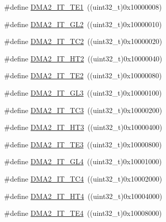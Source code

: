 \begin{DoxyCompactItemize}
\item 
\#define \mbox{\hyperlink{group___d_m_a__interrupts__definition_ga912b0a1e7104dc70d25ca1a33338b6eb}{D\+M\+A2\+\_\+\+I\+T\+\_\+\+T\+E1}}~((uint32\+\_\+t)0x10000008)
\item 
\#define \mbox{\hyperlink{group___d_m_a__interrupts__definition_gad1b225f7053b88eeee62e5ed1801b5c3}{D\+M\+A2\+\_\+\+I\+T\+\_\+\+G\+L2}}~((uint32\+\_\+t)0x10000010)
\item 
\#define \mbox{\hyperlink{group___d_m_a__interrupts__definition_ga174df6fdfa25046c1481ede66ff1eb6d}{D\+M\+A2\+\_\+\+I\+T\+\_\+\+T\+C2}}~((uint32\+\_\+t)0x10000020)
\item 
\#define \mbox{\hyperlink{group___d_m_a__interrupts__definition_gaf1cb017935477795a7bfb0d1a271e69a}{D\+M\+A2\+\_\+\+I\+T\+\_\+\+H\+T2}}~((uint32\+\_\+t)0x10000040)
\item 
\#define \mbox{\hyperlink{group___d_m_a__interrupts__definition_ga5f32004b492a225495c9c1dcd5002042}{D\+M\+A2\+\_\+\+I\+T\+\_\+\+T\+E2}}~((uint32\+\_\+t)0x10000080)
\item 
\#define \mbox{\hyperlink{group___d_m_a__interrupts__definition_ga9876a20bc7ae5ccff6d4e62a8b767070}{D\+M\+A2\+\_\+\+I\+T\+\_\+\+G\+L3}}~((uint32\+\_\+t)0x10000100)
\item 
\#define \mbox{\hyperlink{group___d_m_a__interrupts__definition_ga249abc1068e8979f52d7d867b5de5a75}{D\+M\+A2\+\_\+\+I\+T\+\_\+\+T\+C3}}~((uint32\+\_\+t)0x10000200)
\item 
\#define \mbox{\hyperlink{group___d_m_a__interrupts__definition_gab3c0d024e03f9fdca539710c7e528904}{D\+M\+A2\+\_\+\+I\+T\+\_\+\+H\+T3}}~((uint32\+\_\+t)0x10000400)
\item 
\#define \mbox{\hyperlink{group___d_m_a__interrupts__definition_ga2fd4ce5d7e2d67c05379f826ae1b1da6}{D\+M\+A2\+\_\+\+I\+T\+\_\+\+T\+E3}}~((uint32\+\_\+t)0x10000800)
\item 
\#define \mbox{\hyperlink{group___d_m_a__interrupts__definition_ga004761fbcd7dba2f242639b2992ada17}{D\+M\+A2\+\_\+\+I\+T\+\_\+\+G\+L4}}~((uint32\+\_\+t)0x10001000)
\item 
\#define \mbox{\hyperlink{group___d_m_a__interrupts__definition_ga54b6716e82894f76c87926afe2a65f30}{D\+M\+A2\+\_\+\+I\+T\+\_\+\+T\+C4}}~((uint32\+\_\+t)0x10002000)
\item 
\#define \mbox{\hyperlink{group___d_m_a__interrupts__definition_ga4aa775a2f1e10783bd43911ad65bb28b}{D\+M\+A2\+\_\+\+I\+T\+\_\+\+H\+T4}}~((uint32\+\_\+t)0x10004000)
\item 
\#define \mbox{\hyperlink{group___d_m_a__interrupts__definition_ga54dfd8a41ad683f01e3103e6473a7aff}{D\+M\+A2\+\_\+\+I\+T\+\_\+\+T\+E4}}~((uint32\+\_\+t)0x10008000)

\end{DoxyCompactItemize}
